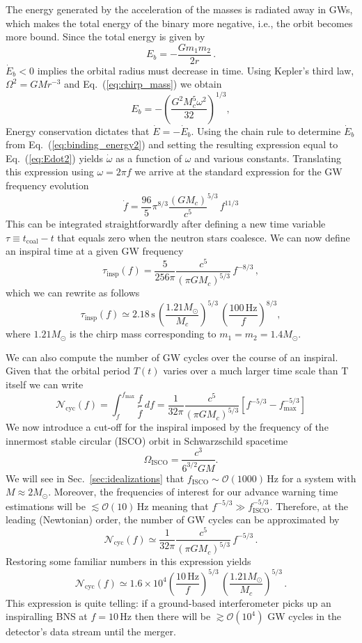 \documentclass[amsmath,amssymb,aps,floats,amsfonts,notitlepage,superscriptaddress,eqsecnum,nofootinbib,10pt]{revtex4-1}
\newcommand{\ord}{\mathcal{O}}
\newcommand{\f}{\frac}
\newcommand{\be}{\begin{equation}}
\newcommand{\ee}{\end{equation}}
\begin{document}
The energy generated by the acceleration of the masses is radiated away in GWs,
which makes the total energy of the binary more negative, i.e., the orbit becomes more bound. 
Since the total energy is given by
%
\be
E_b = -\frac{G m_1 m_2}{2r}\, . \label{eq:binding_energy1}
\ee
%
$\dot{E}_b < 0$ implies the orbital radius must decrease in time. 
Using Kepler's third law, $ \Omega^2 = G M r^{-3}$ and Eq.~(\ref{eq:chirp_mass}) we obtain
%
\be
E_b = -\left(\f{G^2 M_c^5 \omega^2}{32}\right)^{1/3}, \label{eq:binding_energy2}
\ee
%
Energy conservation dictates that $\dot{E}=-\dot{E}_b$. Using the chain rule to determine $\dot{E}_b$ from Eq.~(\ref{eq:binding_energy2})
and setting the resulting expression equal to Eq.~(\ref{eq:Edot2}) yields $\dot{\omega}$ as a function of $\omega$ and various constants.
Translating this expression using $\omega=2\pi f$ we arrive at the standard expression for the GW frequency evolution
%
\be
\dot{f} = \f{96}{5}\pi^{8/3} \f{(G M_c)}{c^5}^{5/3}\, f^{11/3} \label{eq:fdot}
\ee
%
This can be integrated straightforwardly after defining a new time variable $\tau\equiv t_\text{coal}-t$ that equals zero when the neutron stars coalesce.
We can now define an inspiral time at a given GW frequency
%
\be
\tau_\text{insp}(f) = \f{5}{256\pi}\f{c^5}{(\pi G M_c)^{5/3}} \,f^{-8/3}\label{eq:tau_insp}\, ,
\ee
%
%
%
which we can rewrite as follows
%
\be
\tau_\text{insp}(f) \simeq 2.18\,\text{s} \, \left(\f{1.21 M_\odot}{M_c}\right)^{5/3}\,\left(\f{100\,\text{Hz}}{f}\right)^{8/3}, \label{eq:tau_insp2}
\ee
%
where $1.21 M_\odot$ is the chirp mass corresponding to $m_1=m_2=1.4 M_\odot$.

We can also compute the number of GW cycles over the course of an inspiral. Given that the orbital period $T(t)$ varies over a much larger time scale than T itself
we can write
%
\be
\mathcal{N}_\text{cyc}(f) = \int_f^{f_\text{max}} \f{f}{\dot{f}}\, df =\f{1}{32\pi} \f{c^5}{(\pi G M_c)^{5/3}}\left[ f^{-5/3}-f_\text{max}^{-5/3}\right] \label{eq:Ncyc1}
\ee
%
We now introduce a cut-off for the inspiral imposed by the frequency of the innermost stable circular (ISCO) orbit in Schwarzschild spacetime
\be
\Omega_\text{ISCO} = \f{c^3}{6^{3/2} G M} \label{eq:Sch_f_isco}.
\ee
%
%
We will see in Sec.~\ref{sec:idealizations} that $f_\text{ISCO} \sim \mathcal{O}(1000)\,$Hz for a system with $M\approx 2 M_\odot$. Moreover, the frequencies of interest for our advance warning time estimations will be $\lesssim \mathcal{O}(10)\,$Hz
meaning that $f^{-5/3} \gg f_\text{ISCO}^{-5/3}$. Therefore, at the leading (Newtonian) order, the number of GW cycles can be approximated by
%
\be
\mathcal{N}_\text{cyc}(f) \simeq \f{1}{32\pi} \f{c^5}{(\pi G M_c)^{5/3}}\, f^{-5/3} \, . \label{eq:Ncyc2}
\ee
%
Restoring some familiar numbers in this expression yields
%
\be
\mathcal{N}_\text{cyc}(f)\simeq 1.6\times 10^4 \left(\f{10\,\text{Hz}}{f} \right)^{5/3}\,\left(\f{1.21 M_\odot}{M_c}\right)^{5/3}\label{eq:Ncyc3}\, .
\ee
%
This expression is quite telling: if a ground-based interferometer picks up an
inspiralling BNS at $f=10\,$Hz then there will be $\gtrsim \ord(10^4)$ GW cycles in the detector's data stream until the merger.
\end{document}
